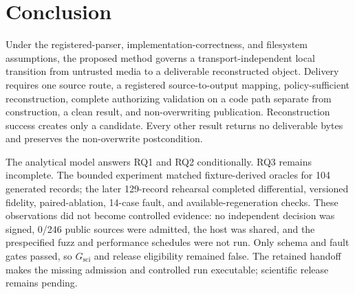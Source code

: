 \section{Conclusion}
\label{sec:conclusion}

Under the registered-parser, implementation-correctness, and filesystem
assumptions, the proposed method governs a transport-independent local
transition from untrusted media to a deliverable reconstructed object. Delivery
requires one source route, a registered source-to-output mapping,
policy-sufficient reconstruction, complete authorizing validation on a code path
separate from construction, a clean result, and non-overwriting publication.
Reconstruction success creates only a candidate. Every other result returns no
deliverable bytes and preserves the non-overwrite postcondition.

The analytical model answers RQ1 and RQ2 conditionally. RQ3 remains incomplete.
The bounded experiment matched fixture-derived oracles for 104 generated
records; the later 129-record rehearsal completed differential, versioned
fidelity, paired-ablation, 14-case fault, and available-regeneration checks.
These observations did not become controlled evidence: no independent decision
was signed, 0/246 public sources were admitted, the host was shared, and the
prespecified fuzz and performance schedules were not run. Only schema and fault
gates passed, so \(G_{\mathrm{sci}}\) and release eligibility remained false.
The retained handoff makes the missing admission and controlled run executable;
scientific release remains pending.
